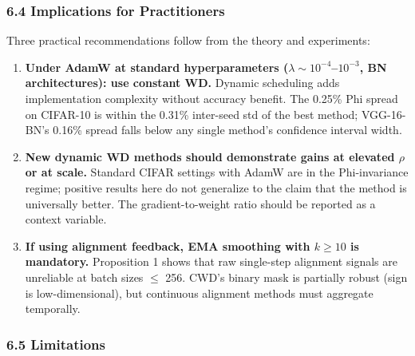 \documentclass[
]{article}
\begin{document}
\hypertarget{implications-for-practitioners}{%
\subsubsection{6.4 Implications for
Practitioners}\label{implications-for-practitioners}}

Three practical recommendations follow from the theory and experiments:

\begin{enumerate}
\def\labelenumi{\arabic{enumi}.}
\item
  \textbf{Under AdamW at standard hyperparameters
  (\(\lambda \sim 10^{-4}\)--\(10^{-3}\), BN architectures): use
  constant WD.} Dynamic scheduling adds implementation complexity
  without accuracy benefit. The 0.25\% Phi spread on CIFAR-10 is within
  the 0.31\% inter-seed std of the best method; VGG-16-BN's 0.16\%
  spread falls below any single method's confidence interval width.
\item
  \textbf{New dynamic WD methods should demonstrate gains at elevated
  \(\rho\) or at scale.} Standard CIFAR settings with AdamW are in the
  Phi-invariance regime; positive results here do not generalize to the
  claim that the method is universally better. The gradient-to-weight
  ratio should be reported as a context variable.
\item
  \textbf{If using alignment feedback, EMA smoothing with \(k \geq 10\)
  is mandatory.} Proposition 1 shows that raw single-step alignment
  signals are unreliable at batch sizes \(\leq\) 256. CWD's binary mask
  is partially robust (sign is low-dimensional), but continuous
  alignment methods must aggregate temporally.
\end{enumerate}

\hypertarget{limitations}{%
\subsubsection{6.5 Limitations}\label{limitations}}
\end{document}
